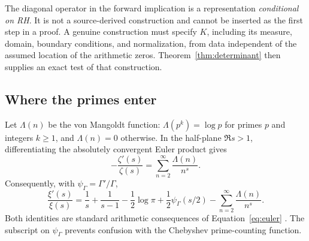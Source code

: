 \documentclass[11pt,letterpaper]{article}
\numberwithin{equation}{section}
\theoremstyle{definition}
\theoremstyle{remark}
\begin{document}
The diagonal operator in the forward implication is a representation \emph{conditional on RH}. It is not a source-derived construction and cannot be inserted as the first step in a proof. A genuine construction must specify $K$, including its measure, domain, boundary conditions, and normalization, from data independent of the assumed location of the arithmetic zeros. Theorem~\ref{thm:determinant} then supplies an exact test of that construction.

\subsection{Where the primes enter}
Let $\Lambda(n)$ be the von Mangoldt function: $\Lambda(p^k)=\log p$ for primes $p$ and integers $k\geq1$, and $\Lambda(n)=0$ otherwise. In the half-plane $\Re s>1$, differentiating the absolutely convergent Euler product gives
\begin{equation}
 -\frac{\zeta'(s)}{\zeta(s)}=\sum_{n=2}^{\infty}\frac{\Lambda(n)}{n^s}.
 \label{eq:mangoldt}
\end{equation}
Consequently, with $\psi_\Gamma=\Gamma'/\Gamma$,
\begin{equation}
 \frac{\xi'(s)}{\xi(s)}
 =\frac1s+\frac1{s-1}-\frac12\log\pi
  +\frac12\psi_\Gamma(s/2)
  -\sum_{n=2}^{\infty}\frac{\Lambda(n)}{n^s}.
 \label{eq:arithlog}
\end{equation}
Both identities are standard arithmetic consequences of Equation~\eqref{eq:euler} \cite{titchmarsh}. The subscript on $\psi_\Gamma$ prevents confusion with the Chebyshev prime-counting function.
\end{document}
